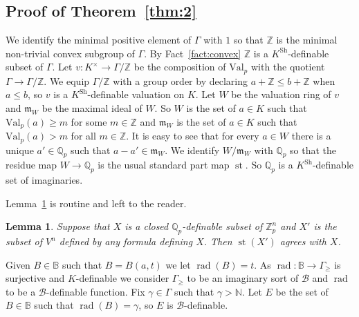\documentclass[bibalpha]{amsart}
\newtheorem{lem}[theorem]{Lemma}
\theoremstyle{definition}
\theoremstyle{remark}
\newcommand{\mfrak}{\mathfrak{m}}
\newcommand{\valp}{\mathrm{Val}_p}
\newcommand{\rad}{\operatorname{rad}}
\newcommand{\ksh}{K^{\mathrm{Sh}}}
\newcommand{\st}{\operatorname{st}}
\newcommand{\Sa}[1]{\ensuremath{\mathscr{#1}}}
\newcommand{\B}{\mathbb{B}}
\newcommand{\Z}{\mathbb{Z}}
\newcommand{\N}{\mathbb{N}}
\newcommand{\Q}{\mathbb{Q}}
\begin{document}
\subsection{Proof of Theorem~\ref{thm:2}}
We identify the minimal positive element of $\Gamma$ with $1$ so that $\Z$ is the minimal non-trivial convex subgroup of $\Gamma$.
By Fact~\ref{fact:convex} $\Z$ is a $\ksh$-definable subset of $\Gamma$.
Let $v : K^\times \to \Gamma/\Z$ be the composition of $\valp$ with the quotient $\Gamma \to \Gamma/\Z$.
We equip $\Gamma/\Z$ with a group order by declaring $a + \Z \leq b + \Z$ when $a \leq b$, so $v$ is a $\ksh$-definable valuation on $K$.
Let $W$ be the valuation ring of $v$ and $\mfrak_W$ be the  maximal ideal of $W$.
So $W$ is the set of $a \in K$ such that $\valp(a) \geq m$ for some $m \in \Z$ and $\mfrak_W$ is the set of $a \in K$ such that $\valp(a) > m$ for all $m \in \Z$.
It is easy to see that for every $a \in W$ there is a unique $a' \in \Q_p$ such that $a - a' \in \mfrak_W$.
We identify $W/\mfrak_W$ with $\Q_p$ so that the residue map $W \to \Q_p$ is the usual standard part map $\st$.
So $\Q_p$ is a $\ksh$-definable set of imaginaries.
\newline

\noindent
Lemma~\ref{lem:st} is routine and left to the reader.

\begin{lem}
\label{lem:st}
Suppose that $X$ is a closed $\Q_p$-definable subset of $\Z^n_p$ and $X'$ is the subset of $V^n$ defined by any formula defining $X$.
Then $\st(X')$ agrees with $X$.
\end{lem}

\noindent
Given $B \in \B$ such that $B = B(a,t)$ we let $\rad(B) = t$.
As $\rad : \B \to \Gamma_\geq$ is surjective and $K$-definable we consider $\Gamma_\geq$ to be an imaginary sort of $\Sa B$ and $\rad$ to be a $\Sa B$-definable function.
Fix $\gamma \in \Gamma$ such that $\gamma > \N$.
Let $E$ be the set of $B \in \B$ such that $\rad(B) = \gamma$, so $E$ is $\Sa B$-definable.
\newline
\end{document}
